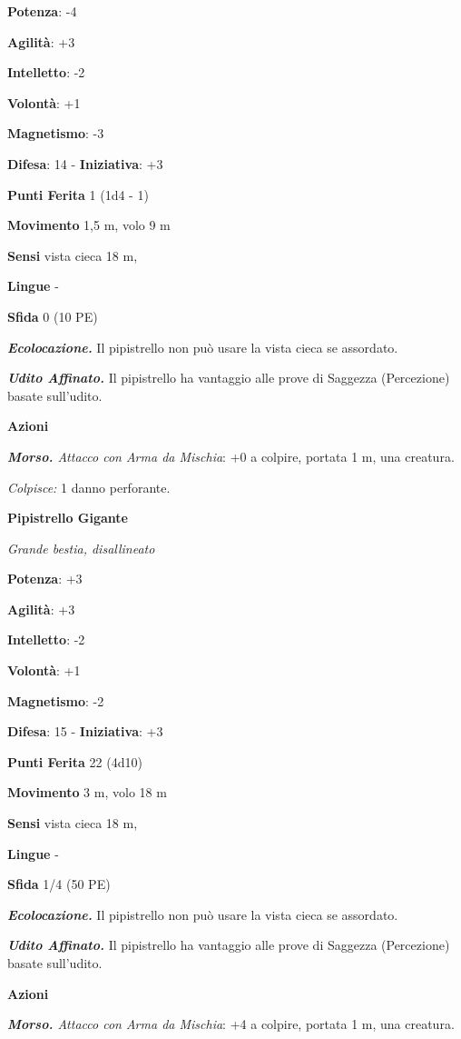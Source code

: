 \begin{multicols}{2}
\textbf{Potenza}: -4

\textbf{Agilità}: +3

\textbf{Intelletto}: -2

\textbf{Volontà}: +1

\textbf{Magnetismo}: -3

\textbf{Difesa}: 14 - \textbf{Iniziativa}: +3

\textbf{Punti Ferita} 1 (1d4 - 1)

\textbf{Movimento} 1,5 m, volo 9 m

\textbf{Sensi} vista cieca 18 m, 

\textbf{Lingue} -

\textbf{Sfida} 0 (10 PE)\smallskip

\emph{\textbf{Ecolocazione.}} Il pipistrello non può usare la vista
cieca se assordato.

\emph{\textbf{Udito Affinato.}} Il pipistrello ha vantaggio alle prove
di Saggezza (Percezione) basate sull'udito.

\smallskip\textbf{Azioni}

\emph{\textbf{Morso.} Attacco con Arma da Mischia}: +0 a colpire,
portata 1 m, una creatura.

\emph{Colpisce:} 1 danno perforante.

\textbf{Pipistrello Gigante}

\emph{Grande bestia, disallineato}

\textbf{Potenza}: +3

\textbf{Agilità}: +3

\textbf{Intelletto}: -2

\textbf{Volontà}: +1

\textbf{Magnetismo}: -2

\textbf{Difesa}: 15 - \textbf{Iniziativa}: +3

\textbf{Punti Ferita} 22 (4d10)

\textbf{Movimento} 3 m, volo 18 m

\textbf{Sensi} vista cieca 18 m, 

\textbf{Lingue} -

\textbf{Sfida} 1/4 (50 PE)\smallskip

\emph{\textbf{Ecolocazione.}} Il pipistrello non può usare la vista
cieca se assordato.

\emph{\textbf{Udito Affinato.}} Il pipistrello ha vantaggio alle prove
di Saggezza (Percezione) basate sull'udito.

\smallskip\textbf{Azioni}

\emph{\textbf{Morso.} Attacco con Arma da Mischia}: +4 a colpire,
portata 1 m, una creatura.


\end{multicols}
